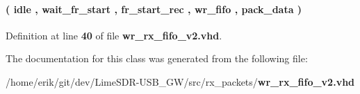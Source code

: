 \paragraph[{state\+\_\+type}]{ {\bfseries \textcolor{vhdlchar}{(}\textcolor{vhdlchar}{ }\textcolor{vhdlchar}{idle}\textcolor{vhdlchar}{ }\textcolor{vhdlchar}{,}\textcolor{vhdlchar}{ }\textcolor{vhdlchar}{wait\+\_\+fr\+\_\+start}\textcolor{vhdlchar}{ }\textcolor{vhdlchar}{,}\textcolor{vhdlchar}{ }\textcolor{vhdlchar}{fr\+\_\+start\+\_\+rec}\textcolor{vhdlchar}{ }\textcolor{vhdlchar}{,}\textcolor{vhdlchar}{ }\textcolor{vhdlchar}{wr\+\_\+fifo}\textcolor{vhdlchar}{ }\textcolor{vhdlchar}{,}\textcolor{vhdlchar}{ }\textcolor{vhdlchar}{pack\+\_\+data}\textcolor{vhdlchar}{ }\textcolor{vhdlchar}{)}\textcolor{vhdlchar}{ }} \hspace{0.3cm}{\ttfamily [Type]}}\label{classwr__rx__fifo__v2_1_1arch_a59c620b7cbe37fbf2cec4074077fd851}


Definition at line {\bf 40} of file {\bf wr\+\_\+rx\+\_\+fifo\+\_\+v2.\+vhd}.



The documentation for this class was generated from the following file\+:\begin{DoxyCompactItemize}
\item 
/home/erik/git/dev/\+Lime\+S\+D\+R-\/\+U\+S\+B\+\_\+\+G\+W/src/rx\+\_\+packets/{\bf wr\+\_\+rx\+\_\+fifo\+\_\+v2.\+vhd}\end{DoxyCompactItemize}
